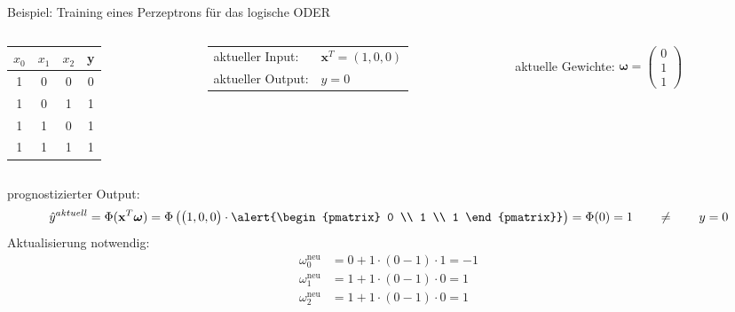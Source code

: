 \documentclass[11pt, aspectratio=169, t]{beamer}
\begin{document}
\begin{frame}{Beispiel: Training eines Perzeptrons für das logische ODER}
\begin{small}
\begin{columns}
\begin{column}{0.25\textwidth}
\hspace{0.5cm}
\begin{footnotesize}
\begin{tabular}{cccc} \toprule
$x_0$ & $x_1$ & $x_2$ & y \\ \midrule
1 & 0 & 0 & 0 \\
1 & 0 & 1 & 1 \\
1 & 1 & 0 & 1 \\
1 & 1 & 1 & 1 \\ \bottomrule
\end{tabular} \end{footnotesize}
\end{column}
\begin{column}{0.4\textwidth}
\begin{tabular}{ll}
aktueller Input: & $\mathbf{x}^{T} = (1, 0, 0)$ \\
aktueller Output: & $y=0$ \\
\end{tabular}
\end{column}
\begin{column}{0.4\textwidth}
aktuelle Gewichte: \alert{ $\boldsymbol{\omega} = \begin{pmatrix} 0 \\ 1 \\ 1 \end{pmatrix}$ }
\end{column}
\end{columns}
prognostizierter Output:
\[\hat{y}^{aktuell} = \Phi(\mathbf{x}^{T}\boldsymbol{\omega}) = \Phi\left( \begin{pmatrix} 1, 0, 0 \end{pmatrix}\cdot \alert{\begin{pmatrix} 0 \\ 1 \\ 1 \end{pmatrix}} \right) = \Phi(0) = 1 \qquad \neq \qquad y = 0\]
Aktualisierung notwendig:
\begin{align*}
\omega_0^{\text{neu}} &=  0 + 1\cdot (0-1)\cdot 1 = -1 \\
\omega_1^{\text{neu}} &=  1 + 1\cdot (0-1)\cdot 0 = 1 \\
\omega_2^{\text{neu}} &=  1 + 1\cdot (0-1)\cdot 0 = 1
\end{align*}
\end{small}
\end{frame}
\end{document}
